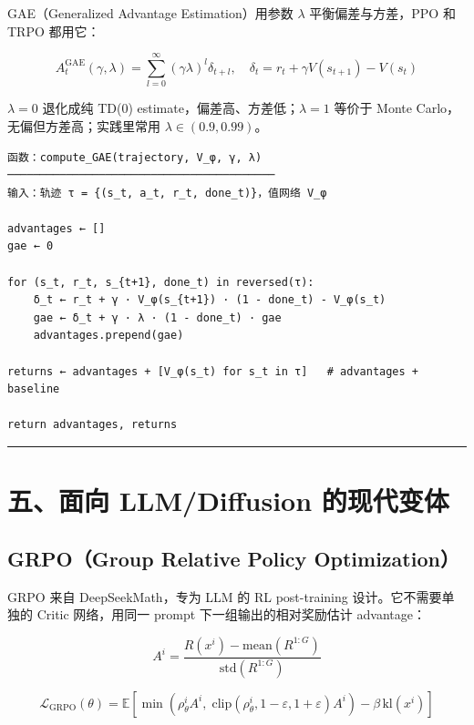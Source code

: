 GAE（Generalized Advantage Estimation）用参数 \(\lambda\) 平衡偏差与方差，PPO 和 TRPO 都用它：

\[
A_t^\mathrm{GAE}(\gamma, \lambda) = \sum_{l=0}^{\infty} (\gamma\lambda)^l \delta_{t+l}, \quad \delta_t = r_t + \gamma V(s_{t+1}) - V(s_t)
\]

\(\lambda = 0\) 退化成纯 TD(0) estimate，偏差高、方差低；\(\lambda = 1\) 等价于 Monte Carlo，无偏但方差高；实践里常用 \(\lambda \in (0.9, 0.99)\)。

\begin{verbatim}
函数：compute_GAE(trajectory, V_φ, γ, λ)
─────────────────────────────────────────
输入：轨迹 τ = {(s_t, a_t, r_t, done_t)}，值网络 V_φ

advantages ← []
gae ← 0

for (s_t, r_t, s_{t+1}, done_t) in reversed(τ):
    δ_t ← r_t + γ · V_φ(s_{t+1}) · (1 - done_t) - V_φ(s_t)
    gae ← δ_t + γ · λ · (1 - done_t) · gae
    advantages.prepend(gae)

returns ← advantages + [V_φ(s_t) for s_t in τ]   # advantages + baseline

return advantages, returns
\end{verbatim}

\hrule

\section{五、面向 LLM/Diffusion 的现代变体}

\subsection{GRPO（Group Relative Policy Optimization）}

GRPO 来自 DeepSeekMath，专为 LLM 的 RL post-training 设计。它不需要单独的 Critic 网络，用同一 prompt 下一组输出的相对奖励估计 advantage：

\[
A^i = \frac{R(x^i) - \mathrm{mean}(R^{1:G})}{\mathrm{std}(R^{1:G})}
\]

\[
\mathcal{L}_\mathrm{GRPO}(\theta) = \mathbb{E}\left[\min\!\left(\rho_\theta^i A^i,\; \mathrm{clip}(\rho_\theta^i, 1-\varepsilon, 1+\varepsilon) A^i\right) - \beta\, \mathrm{kl}(x^i)\right]
\]

